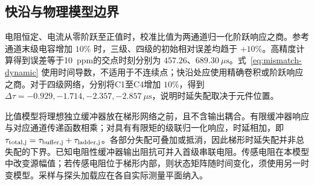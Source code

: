 \subsection{快沿与物理模型边界}

电阻恒定、电流从零阶跃至正值时，校准比值为两通道归一化阶跃响应之商。参考通道末级电容增加 $10\%$ 时，三级、四级的初始相对误差均趋于 $+10\%$。高精度计算得到误差等于10~ppm的交点时刻分别为 $457.26$、$689.30~\mu\mathrm s$。式~\eqref{eq:mismatch-dynamic} 使用时间导数，不适用于不连续点；快沿处应使用精确卷积或阶跃响应之商。对于四级网络，分别将C1至C4增加 $10\%$，得到 $\Delta\tau=-0.929,-1.714,-2.357,-2.857~\mu\mathrm s$，说明时延失配取决于元件位置。

比值模型将理想独立缓冲器放在梯形网络之前，且不含输出耦合。有限缓冲器响应与对应通道传递函数相乘；对具有有限矩的级联归一化响应，时延相加，即 $\tau_{\rm total,j}=\tau_{\rm buffer,j}+\tau_{\rm ladder,j}$。各部分失配可叠加或抵消，因此梯形时延失配并非总失配的下界。已知电阻性缓冲器输出阻抗可并入首级串联电阻。传感电阻在本模型中改变源幅值；若传感电阻位于梯形内部，则状态矩阵随时间变化，须使用另一时变模型。采样与探头加载应在各自实际测量平面纳入。




\FloatBarrier
